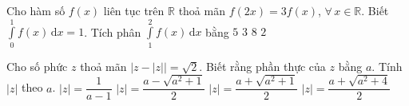 \begin{ex}%
Cho hàm số $ f(x) $ liên tục trên $ \mathbb{R} $ thoả mãn $ f(2x) = 3 f(x) $, $ \forall \, x \in \mathbb{R} $. Biết $ \displaystyle \int \limits^1_0 f(x) \mathrm{\, d} x = 1 $. Tích phân $ \displaystyle \int \limits^2_1 f(x) \mathrm{\, d} x $ bằng	
	\choice
	{\True $ 5 $}
	{$ 3 $}
	{$ 8 $}
	{$ 2 $}
\end{ex}
\begin{ex}%
Cho số phức $ z $ thoả mãn $  \Big | z - |z|  \Big | = \sqrt{2} $. Biết rằng phần thực của $ z $ bằng $ a $. Tính $ |z| $	theo $ a $.
	\choice
	{$ |z| = \dfrac{1}{a-1} $}
	{$ |z| = \dfrac{a - \sqrt{a^2 + 1}}{2} $}
	{$ |z| = \dfrac{a + \sqrt{a^2 + 1}}{2} $}
	{\True $ |z| = \dfrac{a + \sqrt{a^2 + 4}}{2} $}
\end{ex}
